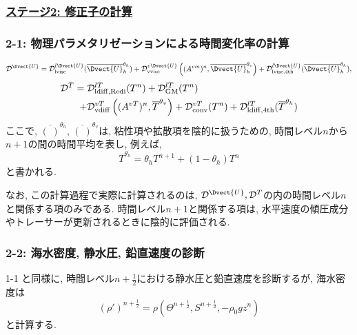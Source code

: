 \subsubsection*{\underline{ステージ2: 修正子の計算}}
\subsubsection*{2-1: 物理パラメタリゼーションによる時間変化率の計算}
\vspace{-1.2cm}
\begin{align*}
  \mathcal{D}^{\Dvect{U}}
=
   \mathcal{D}^{l\Dvect{U}}_{\rm lvisc} ( \overline{\Dvect{U}}_h^{\theta_h})
 + \mathcal{D}^{v\Dvect{U}}_{\rm vvisc}
    \left( (A^{vm})^n, \overline{\Dvect{U}}_h^{\theta_v} \right)
 + \mathcal{D}^{l\Dvect{U}}_{\rm lvisc,4th} (\overline{\Dvect{U}}_h^{\theta_h}),
\end{align*}
\begin{align*}
  \mathcal{D}^{T} 
  = 
    \;&\mathcal{D}^{lT}_{\rm ldiff,Redi} (T^n)
    + \mathcal{D}^{lT}_{\rm GM} (T^n)           \nonumber  \\
    +& \mathcal{D}^{vT}_{\rm vdiff} 
   	  \left((A^{vT})^n, \overline{T}^{\theta_v} \right)
    + \mathcal{D}^{vT}_{\rm conv} (T^n)
    + \mathcal{D}^{lT}_{\rm ldiff,4th} (\overline{T}^{\theta_h})
\end{align*}
ここで, $\overline{(\;)}^{\theta_h}$, $\overline{(\;)}^{\theta_v}$は, 
粘性項や拡散項を陰的に扱うための, 時間レベル$n$から$n+1$の間の時間平均を表し, 
例えば, 
\begin{equation}
  \overline{T}^{\theta_h} = \theta_h T^{n+1} + (1 - \theta_h)T^n
\label{eq:time_level_average_ldiff}
\end{equation}
と書かれる. 

なお, この計算過程で実際に計算されるのは,
$\mathcal{D}^{\Dvect{U}}, \mathcal{D}^T$の内の時間レベル$n$と関係する項のみである.   
時間レベル$n+1$と関係する項は, 水平速度の傾圧成分やトレーサーが更新されるときに陰的に評価される.

\subsubsection*{2-2: 海水密度, 静水圧, 鉛直速度の診断}
\vspace{-.5cm}
1-1 と同様に, 時間レベル$n+\frac{1}{2}$における静水圧と鉛直速度を診断するが,     
海水密度は 
$$
(\rho')^{n+\frac{1}{2}} 
= \rho(\Theta^{n+\frac{1}{2}},S^{n+\frac{1}{2}},-\rho_0 g z^n) 
$$
と計算する.

